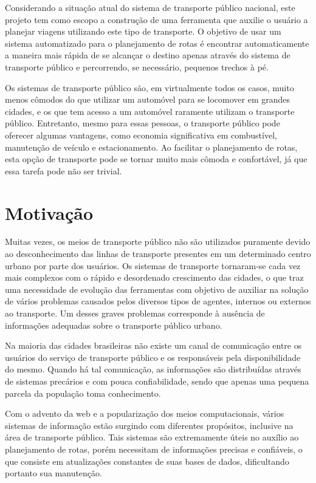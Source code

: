 Considerando a situação atual do sistema de transporte público nacional, este projeto tem como escopo a construção de uma ferramenta que auxilie o usuário a planejar viagens utilizando este tipo de transporte.
O objetivo de usar um sistema automatizado para o planejamento de rotas é encontrar automaticamente a maneira mais rápida de se alcançar o destino apenas através do sistema de transporte público e percorrendo, se necessário, pequenos trechos à pé.

Os sistemas de transporte público são, em virtualmente todos os casos, muito menos cômodos do que utilizar um automóvel para se locomover em grandes cidades, e os que tem acesso a um automóvel raramente utilizam o transporte público. Entretanto, mesmo para essas pessoas, o transporte público pode oferecer algumas vantagens, como economia significativa em combustível, manutenção de veículo e estacionamento. Ao facilitar o planejamento de rotas, esta opção de transporte pode se tornar muito mais cômoda e confortável, já que essa tarefa pode não ser trivial.

\section{Motivação}

Muitas vezes, os meios de transporte público não são utilizados puramente devido ao desconhecimento das linhas de transporte presentes em um determinado centro urbano por parte dos usuários.
Os sistemas de transporte tornaram-se cada vez mais complexos com o rápido e desordenado crescimento das cidades, o que traz uma necessidade de evolução das
ferramentas com objetivo de auxiliar na solução de vários problemas causados pelos diversos tipos de agentes, internos ou externos ao transporte. 
Um desses graves problemas corresponde à ausência de informações adequadas sobre o transporte público urbano.

Na maioria das cidades brasileiras não existe um canal de comunicação entre os usuários do serviço de transporte público e os responsáveis pela disponibilidade do mesmo. Quando há tal comunicação, as informações são distribuídas através de sistemas precários e com pouca confiabilidade, sendo que apenas uma pequena parcela da população toma conhecimento.

Com o advento da web e a popularização dos meios computacionais, vários sistemas de informação estão surgindo com diferentes propósitos, inclusive na área de transporte público. Tais sistemas são extremamente úteis no auxílio ao planejamento de rotas, porém necessitam de informações precisas e confiáveis, o que consiste em atualizações constantes de suas bases de dados, dificultando portanto sua manutenção.

